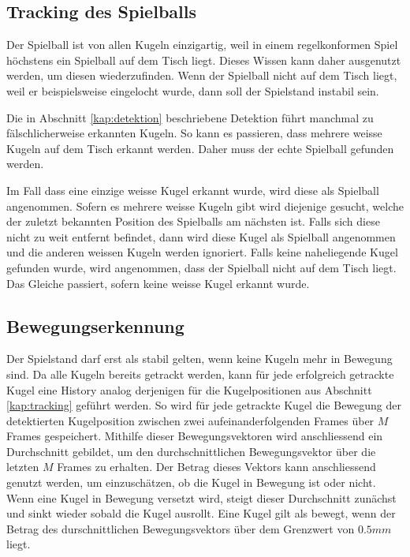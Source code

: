 \subsection{Tracking des Spielballs}
Der Spielball ist von allen Kugeln einzigartig, weil in einem regelkonformen Spiel höchstens ein Spielball auf dem Tisch liegt.
Dieses Wissen kann daher ausgenutzt werden, um diesen wiederzufinden.
Wenn der Spielball nicht auf dem Tisch liegt, weil er beispielsweise eingelocht wurde, dann soll der Spielstand instabil sein.

Die in Abschnitt \ref{kap:detektion} beschriebene Detektion führt manchmal zu fälschlicherweise erkannten Kugeln.
So kann es passieren, dass mehrere weisse Kugeln auf dem Tisch erkannt werden.
Daher muss der echte Spielball gefunden werden.

Im Fall dass eine einzige weisse Kugel erkannt wurde, wird diese als Spielball angenommen.
Sofern es mehrere weisse Kugeln gibt wird diejenige gesucht, welche der zuletzt bekannten Position des Spielballs am nächsten ist.
Falls sich diese nicht zu weit entfernt befindet, dann wird diese Kugel als Spielball angenommen und die
anderen weissen Kugeln werden ignoriert.
Falls keine naheliegende Kugel gefunden wurde, wird angenommen, dass der Spielball nicht auf dem Tisch liegt.
Das Gleiche passiert, sofern keine weisse Kugel erkannt wurde.

\subsection{Bewegungserkennung}
Der Spielstand darf erst als stabil gelten, wenn keine Kugeln mehr in Bewegung sind.
Da alle Kugeln bereits getrackt werden, kann für jede erfolgreich getrackte Kugel eine History analog derjenigen für die
Kugelpositionen aus Abschnitt \ref{kap:tracking} geführt werden.
So wird für jede getrackte Kugel die Bewegung der detektierten Kugelposition zwischen zwei aufeinanderfolgenden Frames
über $M$ Frames gespeichert.
Mithilfe dieser Bewegungsvektoren wird anschliessend ein Durchschnitt gebildet, um den durchschnittlichen Bewegungsvektor über
die letzten $M$ Frames zu erhalten.
Der Betrag dieses Vektors kann anschliessend genutzt werden, um einzuschätzen, ob die Kugel in Bewegung ist oder nicht.
Wenn eine Kugel in Bewegung versetzt wird, steigt dieser Durchschnitt zunächst und sinkt wieder sobald die Kugel ausrollt.
Eine Kugel gilt als bewegt, wenn der Betrag des durschnittlichen Bewegungsvektors über dem Grenzwert von $0.5mm$ liegt.

